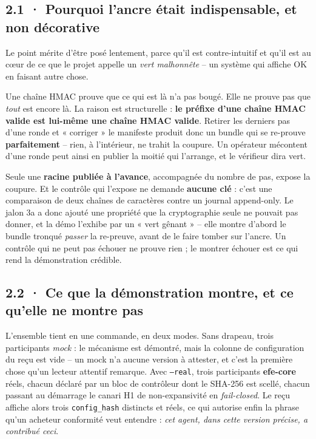 \documentclass[10pt]{article}
\newcommand{\code}[1]{\texttt{\small #1}}
\begin{document}
\subsection{2.1 · Pourquoi l'ancre était indispensable, et non décorative}

Le point mérite d'être posé lentement, parce qu'il est contre-intuitif et qu'il est au cœur de ce que
le projet appelle un \emph{vert malhonnête} -- un système qui affiche OK en faisant autre chose.

Une chaîne HMAC prouve que ce qui est là n'a pas bougé. Elle ne prouve pas que \emph{tout} est encore
là. La raison est structurelle : \textbf{le préfixe d'une chaîne HMAC valide est lui-même une chaîne
HMAC valide}. Retirer les derniers pas d'une ronde et « corriger » le manifeste produit donc un bundle
qui se re-prouve \textbf{parfaitement} -- rien, à l'intérieur, ne trahit la coupure. Un opérateur
mécontent d'une ronde peut ainsi en publier la moitié qui l'arrange, et le vérifieur dira vert.

Seule une \textbf{racine publiée à l'avance}, accompagnée du nombre de pas, expose la coupure. Et le
contrôle qui l'expose ne demande \textbf{aucune clé} : c'est une comparaison de deux chaînes de
caractères contre un journal append-only. Le jalon 3a a donc ajouté une propriété que la cryptographie
seule ne pouvait pas donner, et la démo l'exhibe par un « vert gênant » -- elle montre d'abord le
bundle tronqué \emph{passer} la re-preuve, avant de le faire tomber sur l'ancre. Un contrôle qui ne
peut pas échouer ne prouve rien ; le montrer échouer est ce qui rend la démonstration crédible.

\subsection{2.2 · Ce que la démonstration montre, et ce qu'elle ne montre pas}

L'ensemble tient en une commande, en deux modes. Sans drapeau, trois participants \emph{mock} : le
mécanisme est démontré, mais la colonne de configuration du reçu est vide -- un mock n'a aucune
version à attester, et c'est la première chose qu'un lecteur attentif remarque. Avec \code{--real},
trois participants \textbf{efe-core} réels, chacun déclaré par un bloc de contrôleur dont le SHA-256
est scellé, chacun passant au démarrage le canari H1 de non-expansivité en \emph{fail-closed}. Le reçu
affiche alors trois \code{config\_hash} distincts et réels, ce qui autorise enfin la phrase qu'un
acheteur conformité veut entendre : \emph{cet agent, dans cette version précise, a contribué ceci}.
\end{document}
